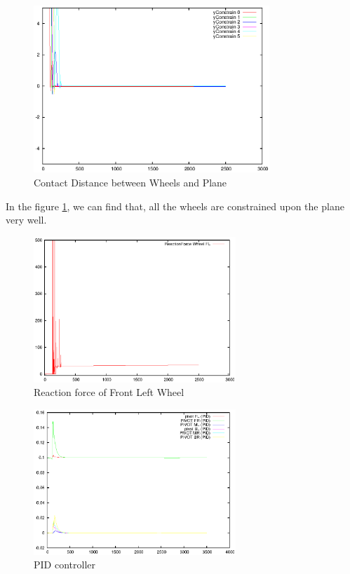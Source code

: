 \begin{figure}[H]
 \begin{center}
      \includegraphics[width=3.5in]{Chapter5/RoverPlaneConstrain.eps}
    \caption{Contact Distance between Wheels and Plane}
    \label{RoverPCons}
  \end{center}
\end{figure}

In the figure \ref{RoverPCons}, we can find that, all the wheels are constrained upon the plane very well.

\begin{figure}[H]
 \begin{center}
      \includegraphics[width=3in]{Chapter5/RoverPlaneReaction.eps}
    \caption{Reaction force of Front Left Wheel}
  \end{center}
\end{figure}

\begin{figure}[H]
 \begin{center}
      \includegraphics[width=3in]{Chapter5/RoverPlanePID.eps}
    \caption{PID controller}
    \label{PIDfig}
  \end{center}
\end{figure}

